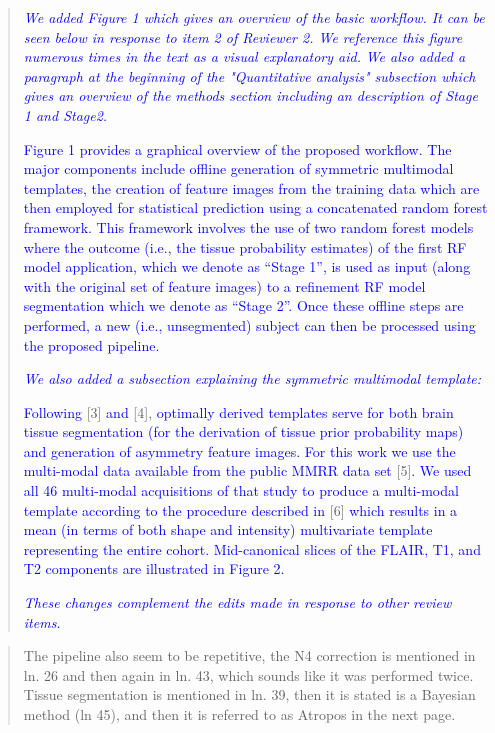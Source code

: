 \documentclass[12pt,]{article}
\begin{document}
\begin{quote}
\emph{\textcolor{blue}{We added Figure 1 which gives an overview of the basic workflow.
  It can be seen below in response to item 2 of Reviewer 2.  We reference
  this figure numerous times in the text as a visual explanatory aid.}}
\emph{\textcolor{blue}{We also added a paragraph at the beginning of the "Quantitative analysis" subsection
  which gives an overview of the methods section including an description of Stage 1 and Stage2.}}

\textcolor{blue}{Figure 1 provides a graphical overview of the proposed workflow.  The major components
include offline generation of symmetric multimodal templates, the creation of
feature images from the training data which are then employed for statistical
prediction using a concatenated random forest framework.  This framework involves
the use of two random forest models where the outcome (i.e., the tissue
probability estimates) of the first RF model application,
which we denote as ``Stage 1'', is used as input (along with the original set of
feature images) to a refinement RF model segmentation which we denote as ``Stage 2''.
Once these offline steps
are performed, a new (i.e., unsegmented) subject can then be processed using the proposed pipeline.}

\emph{\textcolor{blue}{We also added a subsection explaining the symmetric multimodal template:}}

\textcolor{blue}{Following} {[}3{]} \textcolor{blue}{and} {[}4{]},
\textcolor{blue}{optimally derived templates
serve for both brain tissue segmentation (for the derivation of tissue prior probability maps) and generation of asymmetry feature images.
For this work we use the multi-modal data available from the public MMRR data set}
{[}5{]}\textcolor{blue}{.  We used all 46 multi-modal acquisitions of that study to produce a multi-modal template according to the procedure described in}
{[}6{]} \textcolor{blue}{which
results in a mean (in terms of both shape and intensity) multivariate template representing the entire cohort.  Mid-canonical slices of the FLAIR, T1, and T2 components are illustrated in Figure 2.}

\emph{\textcolor{blue}{These changes complement the edits made in response to other review items.}}
\end{quote}

\begin{quote}
The pipeline also seem to be repetitive, the N4 correction is mentioned
in ln. 26 and then again in ln. 43, which sounds like it was performed
twice. Tissue segmentation is mentioned in ln. 39, then it is stated is
a Bayesian method (ln 45), and then it is referred to as Atropos in the
next page.
\end{quote}
\end{document}
